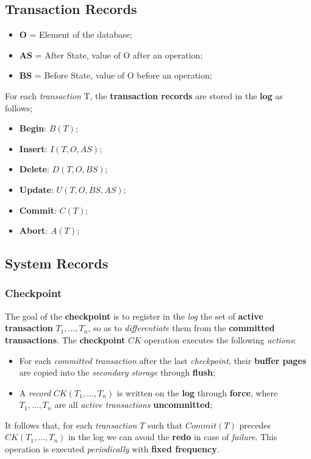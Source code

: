 \documentclass{article}
\begin{document}
\subsection{Transaction Records}
\begin{itemize}
\item \textbf{O} = Element of the database;
\item \textbf{AS} = After State, value of O after an operation;
\item \textbf{BS} = Before State, value of O before an operation;
\end{itemize}
\pagebreak
For each \emph{transaction} T, the \textbf{transaction records} are stored in the \textbf{log} as follows;
\begin{itemize}
\item \textbf{Begin}: $B(T)$;
\item \textbf{Insert}: $I(T,O,AS)$;
\item \textbf{Delete}: $D(T,O,BS)$;
\item \textbf{Update}: $U(T,O,BS,AS)$;
\item \textbf{Commit}: $C(T)$;
\item \textbf{Abort}: $A(T)$;
\end{itemize}
\subsection{System Records}
\subsubsection{Checkpoint}
The goal of the \textbf{checkpoint} is to register in the \emph{log} the set of \textbf{active transaction} $T_1, ..., T_n$, so as to \emph{differentiate} them from the \textbf{committed transactions}. The \textbf{checkpoint} $CK$ operation executes the following \emph{actions}:
\begin{itemize}
\item For each \emph{committed transaction} after the last \emph{checkpoint}, their \textbf{buffer pages} are copied into the \emph{secondary storage} through \textbf{flush};
\item A \emph{record} $CK(T_1, ..., T_n)$ is written on the \textbf{log} through \textbf{force}, where $T_1, ... , T_n$ are all \emph{active transactions} \textbf{uncommitted};
\end{itemize}
It follows that, for each \emph{transaction} $T$ such that $Commit(T)$ precedes $CK(T_1, ..., T_n)$ in the log we can avoid the \textbf{redo} in case of \emph{failure}. This operation is executed \emph{periodically} with \textbf{fixed frequency}.
\end{document}
